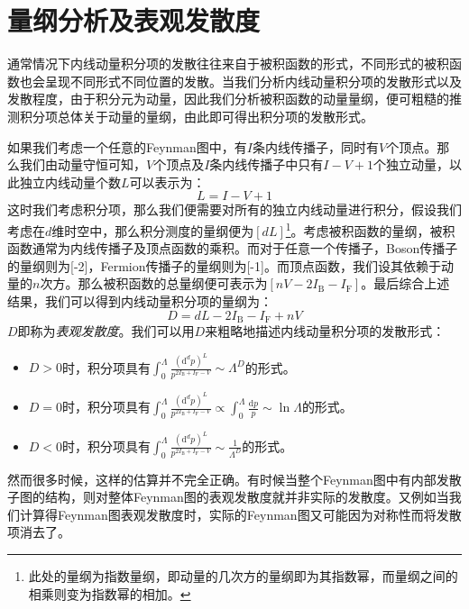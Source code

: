 \section{量纲分析及表观发散度}
通常情况下内线动量积分项的发散往往来自于被积函数的形式，不同形式的被积函数也会呈现不同形式不同位置的发散。当我们分析内线动量积分项的发散形式以及发散程度，由于积分元为动量，因此我们分析被积函数的动量量纲，便可粗糙的推测积分项总体关于动量的量纲，由此即可得出积分项的发散形式。

如果我们考虑一个任意的Feynman图中，有$I$条内线传播子，同时有$V$个顶点。那么我们由动量守恒可知，$V$个顶点及$I$条内线传播子中只有$I-V+1$个独立动量，以此独立内线动量个数$L$可以表示为：
\begin{equation}
L=I-V+1
\end{equation}
这时我们考虑积分项，那么我们便需要对所有的独立内线动量进行积分，假设我们考虑在$d$维时空中，那么积分测度的量纲便为$[dL]$\footnote{此处的量纲为指数量纲，即动量的几次方的量纲即为其指数幂，而量纲之间的相乘则变为指数幂的相加。}。考虑被积函数的量纲，被积函数通常为内线传播子及顶点函数的乘积。而对于任意一个传播子，Boson传播子的量纲则为[-2]，Fermion传播子的量纲则为[-1]。而顶点函数，我们设其依赖于动量的$n$次方。那么被积函数的总量纲便可表示为$[nV-2I_{\text{B}}-I_{\text{F}}]$。最后综合上述结果，我们可以得到内线动量积分项的量纲为：
\begin{equation}
D=dL-2I_{\text{B}}-I_{\text{F}}+nV
\end{equation}
$D$即称为\emph{表观发散度}。我们可以用$D$来粗略地描述内线动量积分项的发散形式：
\begin{itemize}
	\item $D>0$时，积分项具有$\displaystyle{\int^\Lambda_0\frac{(\mathrm{d}^d p)^L}{p^{2I_{\text{B}}+I_{\text{F}}-V}}\sim \Lambda^D}$的形式。
	\item \(D=0\)时，积分项具有\(\displaystyle{\int^\Lambda_0\frac{(\mathrm{d}^d p)^L}{p^{2I_{\text{B}}+I_{\text{F}}-V}}\propto\int^\Lambda_0\frac{\mathrm{d}p}{p}\sim \ln\Lambda}\)的形式。
	\item \(D<0\)时，积分项具有$\displaystyle{\int^\Lambda_0\frac{(\mathrm{d}^d p)^L}{p^{2I_{\text{B}}+I_{\text{F}}-V}}\sim \frac{1}{\Lambda^D}}$的形式。
\end{itemize}

然而很多时候，这样的估算并不完全正确。有时候当整个Feynman图中有内部发散子图的结构，则对整体Feynman图的表观发散度就并非实际的发散度。又例如当我们计算得Feynman图表观发散度时，实际的Feynman图又可能因为对称性而将发散项消去了。

